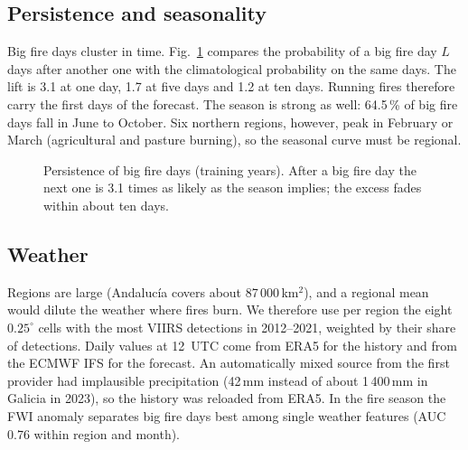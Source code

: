 \documentclass[conference,a4paper]{IEEEtran}
\begin{document}
\subsection{Persistence and seasonality}
Big fire days cluster in time. Fig.~\ref{fig:persist} compares the probability of a big fire day $L$ days after
another one with the climatological probability on the same days. The lift is 3.1 at one day, 1.7 at five days and
1.2 at ten days. Running fires therefore carry the first days of the forecast. The season is strong as well: 64.5\,\%
of big fire days fall in June to October. Six northern regions, however, peak in February or March (agricultural and
pasture burning), so the seasonal curve must be regional.

\begin{figure}[t]
\centering
{}
\caption{Persistence of big fire days (training years). After a big fire day the next one is 3.1 times as likely as
the season implies; the excess fades within about ten days.}
\label{fig:persist}
\end{figure}

\subsection{Weather}
Regions are large (Andaluc\'{i}a covers about 87\,000\,km$^2$), and a regional mean would dilute the weather where fires
burn. We therefore use per region the eight $0.25^\circ$ cells with the most VIIRS detections in 2012--2021, weighted by
their share of detections. Daily values at 12~UTC come from ERA5 \cite{hersbach2020} for the history and from the
ECMWF IFS for the forecast. An automatically mixed source from the first provider had implausible precipitation
(42\,mm instead of about 1\,400\,mm in Galicia in 2023), so the history was reloaded from ERA5. In the fire season the
FWI anomaly separates big fire days best among single weather features (AUC 0.76 within region and month).
\end{document}
